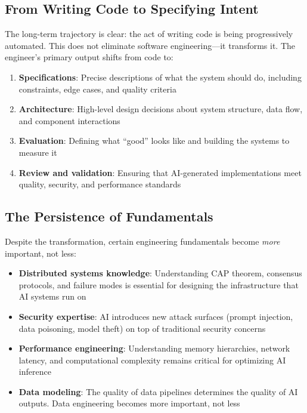 \subsection{From Writing Code to Specifying Intent}

The long-term trajectory is clear: the act of writing code is being progressively automated. This does not eliminate software engineering---it transforms it. The engineer's primary output shifts from code to:

\begin{enumerate}[leftmargin=*]
    \item \textbf{Specifications}: Precise descriptions of what the system should do, including constraints, edge cases, and quality criteria
    \item \textbf{Architecture}: High-level design decisions about system structure, data flow, and component interactions
    \item \textbf{Evaluation}: Defining what ``good'' looks like and building the systems to measure it
    \item \textbf{Review and validation}: Ensuring that AI-generated implementations meet quality, security, and performance standards
\end{enumerate}

\subsection{The Persistence of Fundamentals}

Despite the transformation, certain engineering fundamentals become \emph{more} important, not less:

\begin{itemize}[leftmargin=*]
    \item \textbf{Distributed systems knowledge}: Understanding CAP theorem, consensus protocols, and failure modes is essential for designing the infrastructure that AI systems run on
    \item \textbf{Security expertise}: AI introduces new attack surfaces (prompt injection, data poisoning, model theft) on top of traditional security concerns
    \item \textbf{Performance engineering}: Understanding memory hierarchies, network latency, and computational complexity remains critical for optimizing AI inference
    \item \textbf{Data modeling}: The quality of data pipelines determines the quality of AI outputs. Data engineering becomes more important, not less
\end{itemize}

